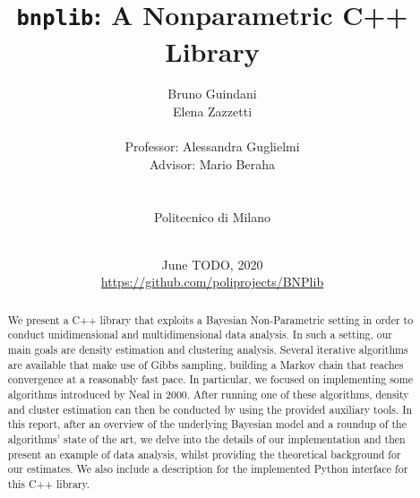 \documentclass[a4paper]{report}
\title{\texttt{bnplib}: A Nonparametric C++ Library}
\author{
Bruno Guindani \\
Elena Zazzetti \\
\\
Professor: Alessandra Guglielmi \\
Advisor: Mario Beraha \\
\\
\\
Politecnico di Milano \\
\\
}
\date{
June TODO, 2020
\\[250pt]
{\color{gray} {\url{https://github.com/poliprojects/BNPlib}}}
}
\begin{document}
\maketitle

\newpage\phantom{a}

\thispagestyle{empty}
\begin{abstract}
We present a C++ library that exploits a Bayesian Non-Parametric setting in order to conduct unidimensional and multidimensional data analysis.
In such a setting, our main goals are density estimation and clustering analysis.
Several iterative algorithms are available that make use of Gibbs sampling, building a Markov chain that reaches convergence at a reasonably fast pace.
In particular, we focused on implementing some algorithms introduced by Neal in 2000.
After running one of these algorithms, density and cluster estimation can then be conducted by using the provided auxiliary tools.
In this report, after an overview of the underlying Bayesian model and a roundup of the algorithms' state of the art, we delve into the details of our implementation and then present an example of data analysis, whilst providing the theoretical background for our estimates.
We also include a description for the implemented Python interface for this C++ library.
\end{abstract}
\setcounter{page}{4}

\tableofcontents















\end{document}
